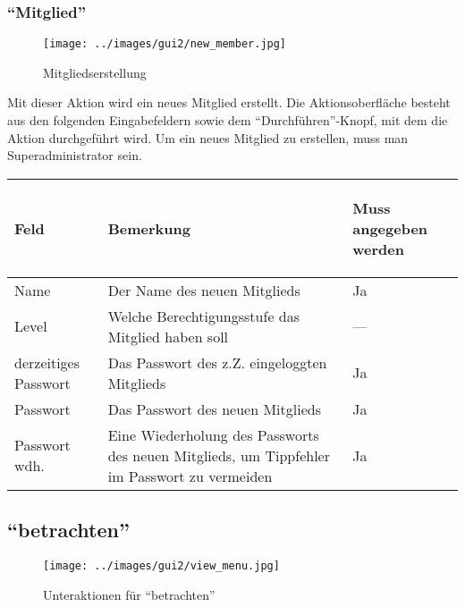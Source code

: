 \subsubsection{``Mitglied''}
\label{subsubsec:detail:new:member}
\begin{figure}\texttt{[image: ../images/gui2/new\_member.jpg]}\caption{Mitgliedserstellung}\label{fig:new_member}\end{figure}

Mit dieser Aktion wird ein neues Mitglied erstellt. Die Aktionsoberfläche besteht aus den folgenden Eingabefeldern sowie dem ``Durchführen''-Knopf, mit dem die Aktion durchgeführt wird.
Um ein neues Mitglied zu erstellen, muss man Superadministrator sein.

	\begin{tabular}{|p{}|p{}|p{}|}\hline
\begin{center}Feld\end{center} & \begin{center}Bemerkung\end{center} & \begin{center}Muss angegeben werden\end{center}\\
\hline
Name & Der Name des neuen Mitglieds & Ja\\
\hline
Level & Welche Berechtigungsstufe das Mitglied haben soll &  ---\\
\hline
derzeitiges Passwort & Das Passwort des z.Z. eingeloggten Mitglieds & Ja\\
\hline
Passwort & Das Passwort des neuen Mitglieds & Ja\\
\hline
Passwort wdh. & Eine Wiederholung des Passworts des neuen Mitglieds, um Tippfehler im Passwort zu vermeiden & Ja\\
\hline
\end{tabular}


\subsection{``betrachten''}
\label{subsec:detail:view}
\begin{figure}\texttt{[image: ../images/gui2/view\_menu.jpg]}\caption{Unteraktionen für ``betrachten''}\label{fig:view_menu}\end{figure}


